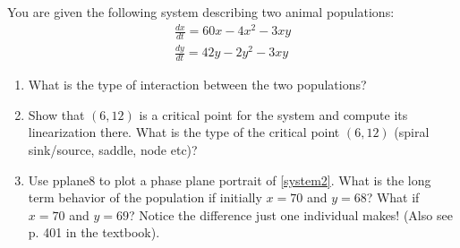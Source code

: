\documentclass[11pt]{article}
\begin{document}
\begin{example}
You are given the following system describing two animal populations:
\begin{equation}
	\begin{aligned}\label{system2}
 		\frac{dx}{dt}=60x-4x^2-3xy\\
 		\frac{dy}{dt}=42y-2y^2-3xy
 \end{aligned}	
\end{equation}
\end{example}
\begin{enumerate}
	\item What is the type of interaction between the two populations?
	\item Show that $(6,12)$ is a critical point for the system and compute its linearization there. What is the type of the critical point $(6,12)$ (spiral sink/source, saddle, node etc)?
	\item Use pplane8 to plot a phase plane portrait of \eqref{system2}.  
	What is the long term behavior of the population if initially $x=70$ and $y=68$? What if $x=70$ and $y=69$? 
	Notice the difference just one individual makes! (Also see p. 401 in the textbook).
\end{enumerate}

 	
\end{document}
